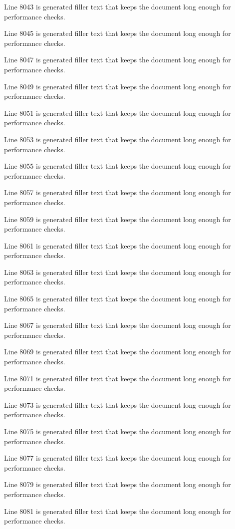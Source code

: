 Line 8043 is generated filler text that keeps the document long enough for performance checks.

Line 8045 is generated filler text that keeps the document long enough for performance checks.

Line 8047 is generated filler text that keeps the document long enough for performance checks.

Line 8049 is generated filler text that keeps the document long enough for performance checks.

Line 8051 is generated filler text that keeps the document long enough for performance checks.

Line 8053 is generated filler text that keeps the document long enough for performance checks.

Line 8055 is generated filler text that keeps the document long enough for performance checks.

Line 8057 is generated filler text that keeps the document long enough for performance checks.

Line 8059 is generated filler text that keeps the document long enough for performance checks.

Line 8061 is generated filler text that keeps the document long enough for performance checks.

Line 8063 is generated filler text that keeps the document long enough for performance checks.

Line 8065 is generated filler text that keeps the document long enough for performance checks.

Line 8067 is generated filler text that keeps the document long enough for performance checks.

Line 8069 is generated filler text that keeps the document long enough for performance checks.

Line 8071 is generated filler text that keeps the document long enough for performance checks.

Line 8073 is generated filler text that keeps the document long enough for performance checks.

Line 8075 is generated filler text that keeps the document long enough for performance checks.

Line 8077 is generated filler text that keeps the document long enough for performance checks.

Line 8079 is generated filler text that keeps the document long enough for performance checks.

Line 8081 is generated filler text that keeps the document long enough for performance checks.

